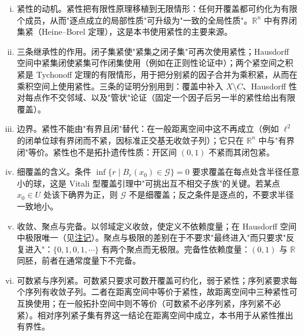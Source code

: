 \documentclass[../main.tex]{subfiles}
\begin{document}
\begin{remark}\label{remark:appA-紧性}
\begin{enumerate}[(i)]
\item 紧性的动机。紧性把有限性原理移植到无限情形：任何开覆盖都可约化为有限个成员，从而"逐点成立的局部性质"可升级为"一致的全局性质"。$\mathbb{R}^n$ 中有界闭集紧（Heine--Borel 定理），这是本书使用紧性的主要来源。
\item 三条继承性的作用。闭子集紧使"紧集之闭子集"可再次使用紧性；Hausdorff 空间中紧集闭使紧集可作闭集使用（例如在正则性论证中）；两个紧空间之积紧是 Tychonoff 定理的有限情形，用于把分别紧的因子合并为乘积紧，从而在乘积空间上使用紧性。三条的证明分别用到：覆盖中补入 $X\setminus C$、Hausdorff 性对每点作不交邻域、以及"管状"论证（固定一个因子后另一半的紧性给出有限覆盖）。
\item 边界。紧性不能由"有界且闭"替代：在一般距离空间中这不再成立（例如 $\ell^2$ 的闭单位球有界闭而不紧，因标准正交基无收敛子列）；它只在 $\mathbb{R}^n$ 中与"有界闭"等价。紧性也不是拓扑遗传性质：开区间 $(0,1)$ 不紧而其闭包紧。
\item 细覆盖的含义。条件 $\inf\{r\mid B_r(x_0)\in\mathscr{G}\}=0$ 要求覆盖在每点处含半径任意小的球，这是 Vitali 型覆盖引理中"可挑出互不相交子族"的关键。若某点 $x_0\in U$ 处该下确界为正，则 $\mathscr{G}$ 不是细覆盖；反之条件是逐点的，不要求半径一致地小。
\item 收敛、聚点与完备。以邻域定义收敛，使定义不依赖度量；在 Hausdorff 空间中极限唯一（见\hyperref[remark:appA-邻域Hausdorff]{注记}）。聚点与极限的差别在于不要求"最终进入"而只要求"反复进入"：$\{0,1,0,1,\cdots\}$ 有两个聚点而无极限。完备性依赖度量：$(0,1)$ 与 $\mathbb{R}$ 同胚，前者在通常度量下不完备。
\item 可数紧与序列紧。可数紧只要求可数开覆盖可约化，弱于紧性；序列紧要求每个序列有收敛子列。二者在距离空间中等价于紧性，故距离空间中三种紧性可互换使用；在一般拓扑空间中则不等价（可数紧不必序列紧，序列紧不必紧）。相对序列紧子集有界这一结论在距离空间中成立，本书用于从紧性推出有界性。
\end{enumerate}
\end{remark}
\end{document}
